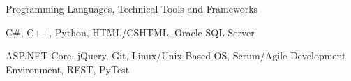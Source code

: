 \begin{cventries}
  \cventry
    {Programming Languages, Technical Tools and Frameworks}
    {}
    {}
    {}
    {
      \begin{cvitems}
        \item {C\#, C++, Python, HTML/CSHTML, Oracle SQL Server}
        \item {ASP.NET Core, jQuery, Git, Linux/Unix Based OS, Scrum/Agile Development Environment, REST, PyTest}
      \end{cvitems}
    }

\end{cventries}
